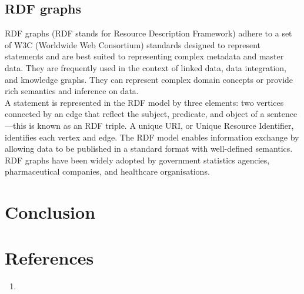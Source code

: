 \documentclass[paper=a4, fontsize=11pt]{scrartcl}
\numberwithin{equation}{section}		%
\numberwithin{figure}{section}			%
\numberwithin{table}{section}				%
\begin{document}
\subsection{RDF graphs}
RDF graphs (RDF stands for Resource Description Framework) adhere to a set of W3C (Worldwide Web Consortium) standards designed to represent statements and are best suited to representing complex metadata and master data. They are frequently used in the context of linked data, data integration, and knowledge graphs. They can represent complex domain concepts or provide rich semantics and inference on data.
\\
A statement is represented in the RDF model by three elements: two vertices connected by an edge that reflect the subject, predicate, and object of a sentence—this is known as an RDF triple. A unique URI, or Unique Resource Identifier, identifies each vertex and edge. The RDF model enables information exchange by allowing data to be published in a standard format with well-defined semantics. RDF graphs have been widely adopted by government statistics agencies, pharmaceutical companies, and healthcare organisations.



\newpage
\section{Conclusion}

\newpage
\section{References}
\begin{enumerate}
    \item 
\end{enumerate}
\end{document}
